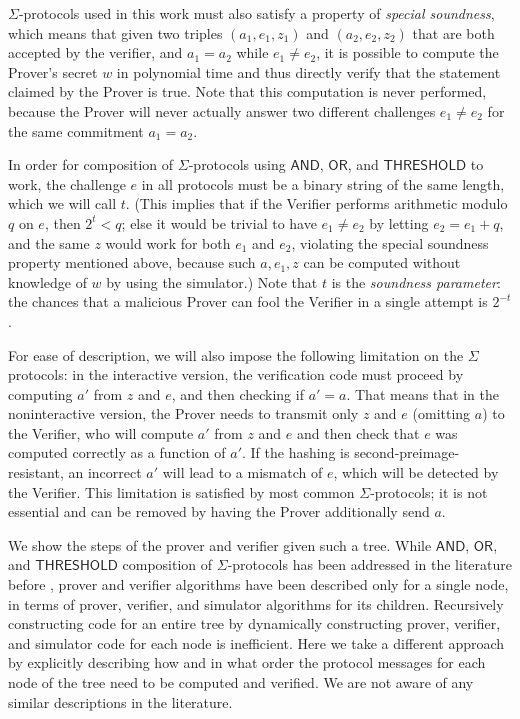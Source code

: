 \documentclass[11pt]{article}
\newcommand{\andnode}{\ensuremath{\mathsf{AND}}}
\newcommand{\ornode}{\ensuremath{\mathsf{OR}}}
\newcommand{\tnode}{\ensuremath{\mathsf{THRESHOLD}}}
\begin{document}
$\Sigma$-protocols used in this work must also satisfy a property of \emph{special soundness}, which means that given two triples $(a_1, e_1, z_1)$ and $(a_2, e_2, z_2)$ that are both accepted by the verifier, and $a_1=a_2$ while $e_1\neq e_2$, it is possible to compute the Prover's secret $w$ in polynomial time and thus directly verify that the statement claimed by the Prover is true.   Note that this computation is never performed, because the Prover will never actually answer two different challenges $e_1\neq e_2$ for the same commitment $a_1=a_2$. 

In order for composition of $\Sigma$-protocols using $\andnode$, $\ornode$, and $\tnode$ to work, the challenge $e$ in all protocols must be a binary string of the same length, which we will call $t$.  (This implies that if the Verifier performs arithmetic modulo $q$ on $e$, then $2^t<q$; else it would be trivial to have $e_1\neq e_2$ by letting $e_2=e_1+q$, and the same $z$ would work for both $e_1$ and $e_2$, violating the special soundness property mentioned above, because such $a, e_1, z$ can be computed without knowledge of $w$ by using the simulator.)  Note that $t$ is the \emph{soundness parameter}: the chances that a malicious Prover can fool the Verifier in a single attempt is $2^{-t}$. 

 For ease of description, we will also impose the following limitation on the $\Sigma$ protocols: in the interactive version, the verification code must proceed by computing $a'$ from $z$ and $e$, and then checking if $a'=a$. That means that in the noninteractive version, the Prover needs to transmit only $z$ and $e$ (omitting $a$) to the Verifier, who will compute $a'$ from $z$ and $e$ and then check that $e$ was computed correctly as a function of $a'$. If the hashing is second-preimage-resistant, an incorrect $a'$ will lead to a mismatch of $e$, which will be detected by the Verifier. This limitation is satisfied by most common $\Sigma$-protocols; it is not essential and can be removed by having the Prover additionally send $a$.

We show the steps of the prover and verifier given such a tree. While $\andnode$, $\ornode$, and $\tnode$ composition of $\Sigma$-protocols has been addressed in the literature before \cite{CDS94}, prover and verifier algorithms have been described only for a single node, in terms of prover, verifier, and simulator algorithms for its children. Recursively constructing code for an entire tree by dynamically constructing prover, verifier, and simulator code for each node is inefficient. Here we take a different approach by explicitly describing how and in what order the protocol messages for each node of the tree need to be computed and verified. We are not aware of any similar descriptions in the literature.
\end{document}

